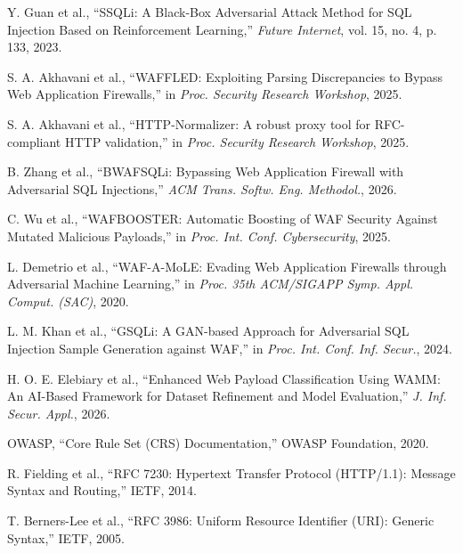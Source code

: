 Y. Guan et al., ``SSQLi: A Black-Box Adversarial Attack Method for SQL Injection Based on Reinforcement Learning,'' \emph{Future Internet}, vol. 15, no. 4, p. 133, 2023.

S. A. Akhavani et al., ``WAFFLED: Exploiting Parsing Discrepancies to Bypass Web Application Firewalls,'' in \emph{Proc. Security Research Workshop}, 2025.

S. A. Akhavani et al., ``HTTP-Normalizer: A robust proxy tool for RFC-compliant HTTP validation,'' in \emph{Proc. Security Research Workshop}, 2025.

B. Zhang et al., ``BWAFSQLi: Bypassing Web Application Firewall with Adversarial SQL Injections,'' \emph{ACM Trans. Softw. Eng. Methodol.}, 2026.

C. Wu et al., ``WAFBOOSTER: Automatic Boosting of WAF Security Against Mutated Malicious Payloads,'' in \emph{Proc. Int. Conf. Cybersecurity}, 2025.

L. Demetrio et al., ``WAF-A-MoLE: Evading Web Application Firewalls through Adversarial Machine Learning,'' in \emph{Proc. 35th ACM/SIGAPP Symp. Appl. Comput. (SAC)}, 2020.

L. M. Khan et al., ``GSQLi: A GAN-based Approach for Adversarial SQL Injection Sample Generation against WAF,'' in \emph{Proc. Int. Conf. Inf. Secur.}, 2024.

H. O. E. Elebiary et al., ``Enhanced Web Payload Classification Using WAMM: An AI-Based Framework for Dataset Refinement and Model Evaluation,'' \emph{J. Inf. Secur. Appl.}, 2026.

OWASP, ``Core Rule Set (CRS) Documentation,'' OWASP Foundation, 2020.






R. Fielding et al., ``RFC 7230: Hypertext Transfer Protocol (HTTP/1.1): Message Syntax and Routing,'' IETF, 2014.

T. Berners-Lee et al., ``RFC 3986: Uniform Resource Identifier (URI): Generic Syntax,'' IETF, 2005.

